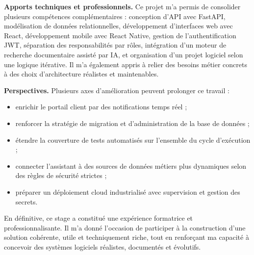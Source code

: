 \vspace{0.3cm}
\textbf{Apports techniques et professionnels.} Ce projet m'a permis de consolider plusieurs compétences complémentaires : conception d'API avec FastAPI, modélisation de données relationnelles, développement d'interfaces web avec React, développement mobile avec React Native, gestion de l'authentification JWT, séparation des responsabilités par rôles, intégration d'un moteur de recherche documentaire assisté par IA, et organisation d'un projet logiciel selon une logique itérative. Il m'a également appris à relier des besoins métier concrets à des choix d'architecture réalistes et maintenables.\par
\vspace{0.3cm}

\textbf{Perspectives.} Plusieurs axes d'amélioration peuvent prolonger ce travail :
\begin{itemize}
    \item enrichir le portail client par des notifications temps réel ;
    \item renforcer la stratégie de migration et d'administration de la base de données ;
    \item étendre la couverture de tests automatisés sur l'ensemble du cycle d'exécution ;
    \item connecter l'assistant à des sources de données métiers plus dynamiques selon des règles de sécurité strictes ;
    \item préparer un déploiement cloud industrialisé avec supervision et gestion des secrets.
\end{itemize}

En définitive, ce stage a constitué une expérience formatrice et professionnalisante. Il m'a donné l'occasion de participer à la construction d'une solution cohérente, utile et techniquement riche, tout en renforçant ma capacité à concevoir des systèmes logiciels réalistes, documentés et évolutifs.\par
